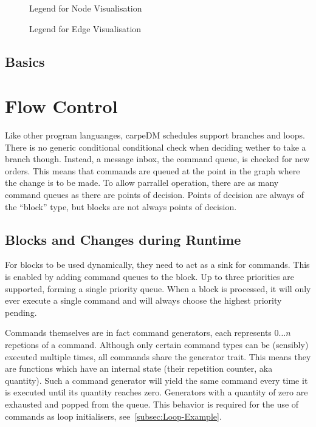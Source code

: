 \begin{figure}[H]
\def\svgwidth{0.8\textwidth}
\graphicspath{{Figures/}}

\caption{Legend for Node Visualisation }
\label{fig:legend_nodes}
\end{figure}

\begin{figure}[H]
\def\svgwidth{0.8\textwidth}
\graphicspath{{Figures/}}

\caption{Legend for Edge Visualisation }
\label{fig:legend_edges}
\end{figure}


\subsection{Basics}

\newpage
\section{Flow Control}
Like other program languanges, carpeDM schedules support branches and loops. There is no generic conditional conditional
check when deciding wether to take a branch though. Instead, a message inbox,
the command queue, is checked for new orders. This means that commands are queued at the point in the graph where the change is to be made.
To allow parrallel operation, there are as many command queues as there are points of decision. Points of decision are
always of the \enquote{block} type, but blocks are not always points of decision.

\subsection{Blocks and Changes during Runtime}
For blocks to be used dynamically, they need to act as a sink for commands. This is enabled by adding command queues to the
block. Up to three priorities are supported, forming a single priority queue. When a block is processed, it will only ever
execute a single command and will always choose the highest priority pending.
\par
Commands themselves are in fact command generators, each represents $0\dots n$ repetions of a command. Although only certain
command types can be (sensibly) executed multiple times, all commands share the generator trait. This means they are functions
which have an internal state (their repetition counter, aka quantity). Such a command generator will yield the same command
every time it is executed until its quantity reaches zero. Generators with a quantity of zero are exhausted and popped from
the queue. This behavior is required for the use of commands as loop initialisers, see~\ref{subsec:Loop-Example}.

